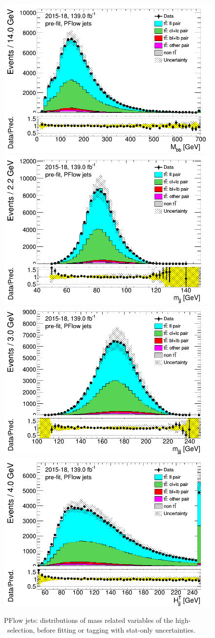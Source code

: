 \newpage
\begin{figure}[H]
\includegraphics[width=.45\textwidth]{FTAG_plots/pretagNoRwnewonlyPFlowall/DataMC_h_Mbb.png}
\includegraphics[width=.45\textwidth]{FTAG_plots/pretagNoRwnewonlyPFlowall/DataMC_h_mjj.png}\\
\includegraphics[width=.45\textwidth]{FTAG_plots/pretagNoRwnewonlyPFlowall/DataMC_h_mjjj.png}
\includegraphics[width=.45\textwidth]{FTAG_plots/pretagNoRwnewonlyPFlowall/DataMC_h_Htjj.png}\\
\caption{PFlow jets: distributions of mass related variables of the high-\pt\ selection, 
before fitting or 
tagging with stat-only uncertainties.} \label{fig:highpT_mass_PFlow}
\end{figure}



